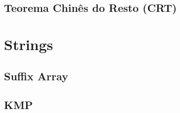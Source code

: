 % 

% 

% 

% 

\subsection{Teorema Chinês do Resto (CRT)}


\section{Strings}

\subsection{Suffix Array}


\subsection{KMP}


% 

% 

